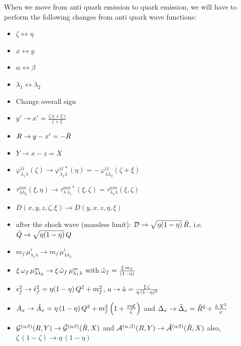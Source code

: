\documentclass[9pt]{article}
\newif\ifmarked \markedtrue
\newcommand{\chg}[1]{\ifmarked{\color{red}#1}\else{#1}\fi}
\numberwithin{equation}{section}
\begin{document}
\begin{enumerate}
When we move from anti quark emission to quark emission, we will have to perform the following changes from anti quark wave functions:
\begin{itemize}
    \item $\zeta \leftrightarrow \eta$
    \item $x\leftrightarrow y$
    \item $\alpha \leftrightarrow \beta$
    \item $\lambda_{1}\leftrightarrow \lambda_{2}$
    \item Change overall sign
    \item $y'\rightarrow x' = \frac{\zeta\,x + \xi\, z}{\zeta + \xi}$
    \item $R \rightarrow y-x' = -\Tilde{R}$
    \item $Y \rightarrow x-z  = X$
    \item $\varphi^{ij}_{\lambda_{1}\lambda}(\zeta) \rightarrow \varphi^{ij\,*}_{\lambda_{2}\lambda}(\eta) = -\,\varphi^{ij}_{\lambda\lambda_{2}}(\zeta+\xi)$
    \item $\tau^{mn}_{\lambda\lambda_{2}}(\xi,\eta) \rightarrow \tau^{mn\,*}_{\lambda\,\lambda_{1}}(\xi,\zeta) = \tau^{nm}_{\lambda_{1}\lambda}(\xi,\zeta)$
    \item $D(x,y,z,\zeta, \xi) \rightarrow D(y,x,z,\eta,\xi)$
    \label{chg:Drule}\item \chg{after the shock wave (massless limit): $\mathcal{D}\rightarrow\sqrt{\eta(1-\eta)}\,\Tilde{R}$, i.e.\ $\Tilde{Q}\rightarrow\sqrt{\eta(1-\eta)}\,Q$}
    \item $m_{f}\,\mu^{i}_{\lambda_{1}\lambda} \rightarrow m_{f}\,\mu^{i}_{\lambda\lambda_{2}} $
    \item $\xi\, \omega_{f}\,\mu^{m}_{\lambda\lambda_{2}} \rightarrow \xi\, \Tilde{\omega}_{f}\,\mu^{m}_{\lambda_{1}\lambda}$ with $\Tilde{\omega}_{f} = \frac{\xi\,m_{f}}{(1-\eta)}$
    \item $\epsilon^{2}_{f} \rightarrow \Tilde{\epsilon}^{2}_{f} = \eta(1-\eta)\, Q^{2} + m^{2}_{f}$, $a \rightarrow \Tilde{a} = \frac{\xi\,\zeta}{\eta\, (1-\eta)^{2}}$
    \item $A_{x} \rightarrow \Tilde{A}_{x} = \eta\,(1-\eta)\,Q^{2} + m^{2}_{f}\left(1+\frac{x\eta\xi}{\zeta}\right)$ and $\Delta_{x} \rightarrow \Tilde{\Delta}_{x} = \Tilde{R}^{2} + \frac{\Tilde{a}\,X^{2}}{x}$
    \item $\mathcal{G}^{(\alpha\beta)}(R,Y) \rightarrow \mathcal{\Tilde{G}}^{(\alpha\beta)}(\Tilde{R},X) $ and $\mathcal{A}^{(\alpha,\beta)}(R,Y) \rightarrow \mathcal{\Tilde{A}}^{(\alpha\beta)}(\Tilde{R},X)$ also, $\zeta\,(1-\zeta) \rightarrow \eta\,(1-\eta)$

\end{itemize}
\end{enumerate}
\end{document}
